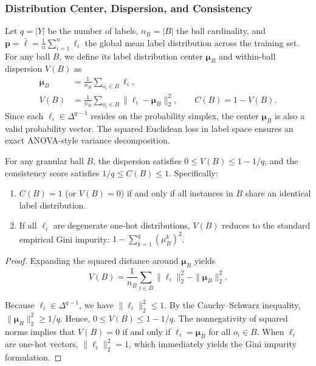 \subsubsection{Distribution Center, Dispersion, and Consistency}
Let $q = |Y|$ be the number of labels, $n_B = |B|$ the ball cardinality, and $\boldsymbol{p} = \bar{\boldsymbol{\ell}} = \frac{1}{n}\sum_{i=1}^n \boldsymbol{\ell}_i$ the global mean label distribution across the training set. For any ball $B$, we define its label distribution center $\boldsymbol{\mu}_B$ and within-ball dispersion $V(B)$ as
\begin{align}
	\boldsymbol{\mu}_B &= \frac{1}{n_B}\sum_{o_i \in B}\boldsymbol{\ell}_i, \label{eq:ball-label-center} \\
	V(B) &= \frac{1}{n_B}\sum_{o_i \in B} \|\boldsymbol{\ell}_i - \boldsymbol{\mu}_B\|_2^2, \qquad C(B) = 1 - V(B). \label{eq:ball-label-dispersion}
\end{align}
Since each $\boldsymbol{\ell}_i \in \Delta^{q-1}$ resides on the probability simplex, the center $\boldsymbol{\mu}_B$ is also a valid probability vector. The squared Euclidean loss in label space ensures an exact ANOVA-style variance decomposition.

\begin{proposition}
	\label{prop:consistency-properties}
	For any granular ball $B$, the dispersion satisfies $0 \le V(B) \le 1 - 1/q$, and the consistency score satisfies $1/q \le C(B) \le 1$. Specifically:
\begin{enumerate}[label=(\roman*)]
		\item $C(B) = 1$ (or $V(B) = 0$) if and only if all instances in $B$ share an identical label distribution.
		\item If all $\boldsymbol{\ell}_i$ are degenerate one-hot distributions, $V(B)$ reduces to the standard empirical Gini impurity: $1 - \sum_{k=1}^q (\mu_B^k)^2$.
	\end{enumerate}
\end{proposition}
\begin{proof}
Expanding the squared distance around $\boldsymbol{\mu}_B$ yields
\[
V(B) = \frac{1}{n_B}\sum_{i \in B}\|\boldsymbol{\ell}_i\|_2^2 - \|\boldsymbol{\mu}_B\|_2^2.
\]

	Because $\boldsymbol{\ell}_i \in \Delta^{q-1}$, we have $\|\boldsymbol{\ell}_i\|_2^2 \le 1$. By the Cauchy--Schwarz inequality, $\|\boldsymbol{\mu}_B\|_2^2 \ge 1/q$. Hence, $0 \le V(B) \le 1 - 1/q$. The nonnegativity of squared norms implies that $V(B) = 0$ if and only if $\boldsymbol{\ell}_i = \boldsymbol{\mu}_B$ for all $o_i \in B$. When $\boldsymbol{\ell}_i$ are one-hot vectors, $\|\boldsymbol{\ell}_i\|_2^2 = 1$, which immediately yields the Gini impurity formulation.
\end{proof}

